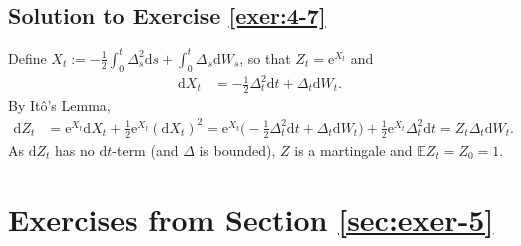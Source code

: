 \documentclass[12pt]{book}
\numberwithin{equation}{chapter}
\theoremstyle{plain}
\numberwithin{theorem}{section}
\theoremstyle{definition}
\numberwithin{exercise}{chapter}
\newcommand{\<}{\langle}
\renewcommand{\>}{\rangle}
\renewcommand{\(}{\left(}
\renewcommand{\)}{\right)}
\renewcommand{\[}{\left[}
\renewcommand{\]}{\right]}
\newcommand\Eb{\mathds{E}}
\newcommand\Del{\Delta}
\newcommand\dd{\mathrm{d}}
\newcommand\ee{\mathrm{e}}
\theoremstyle{definition}
\numberwithin{question}{section}
\begin{document}

\subsection*{Solution to Exercise \ref{exer:4-7}}
Define $X_t := - \tfrac{1}{2}\int_0^t \Del_s^2 \dd s + \int_0^t \Del_s \dd W_s$, so that $Z_t = \ee^{X_t}$ and
\begin{align}
\dd X_t
	&= -\tfrac{1}{2}\Del_t^2 \dd t + \Del_t \dd W_t .
\end{align}
By It\^o's Lemma,
\begin{align}
\dd Z_t
	&=	\ee^{X_t} \dd X_t + \tfrac{1}{2} \ee^{X_t} (\dd X_t)^2
	=		\ee^{X_t} \Big( -\tfrac{1}{2}\Del_t^2 \dd t + \Del_t \dd W_t \Big) + \tfrac{1}{2} \ee^{X_t} \Del_t^2 \dd t
	=		Z_t \Del_t \dd W_t .
\end{align}
As $\dd Z_t$ has no $\dd t$-term (and $\Del$ is bounded), $Z$ is a martingale and $\Eb Z_t = Z_0 = 1$.


\clearpage
\section{Exercises from Section \ref{sec:exer-5}}
\end{document}
